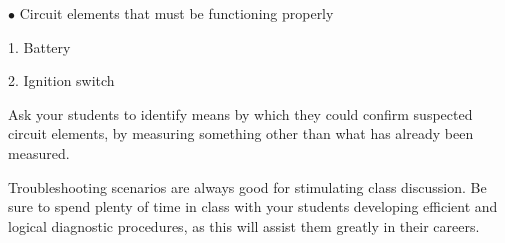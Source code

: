 \medskip
\goodbreak
\item{$\bullet$} Circuit elements that must be functioning properly
\item{1.} Battery
\item{2.} Ignition switch
\medskip







Ask your students to identify means by which they could confirm suspected circuit elements, by measuring something other than what has already been measured.

Troubleshooting scenarios are always good for stimulating class discussion.  Be sure to spend plenty of time in class with your students developing efficient and logical diagnostic procedures, as this will assist them greatly in their careers.




